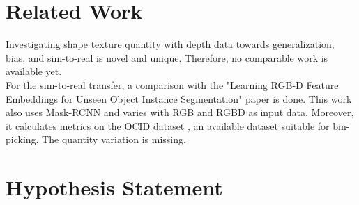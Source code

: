 	\section{Related Work}
	\label{sec:related-work}
		Investigating shape texture quantity with depth data towards generalization, bias, and sim-to-real is novel and unique. Therefore, no comparable work is available yet. \\
		For the sim-to-real transfer, a comparison with the "Learning RGB-D Feature Embeddings for Unseen Object Instance Segmentation" \cite{Xiang2021} paper is done. This work also uses Mask-RCNN \cite{Kaiming2017} and varies with RGB and RGBD as input data. Moreover, it calculates metrics on the OCID dataset \cite{Suchi2019}, an available dataset suitable for bin-picking. The quantity variation is missing.
	
	
	\section{Hypothesis Statement}
	\label{sec:hypothesis-statement}	
	
	
	



			